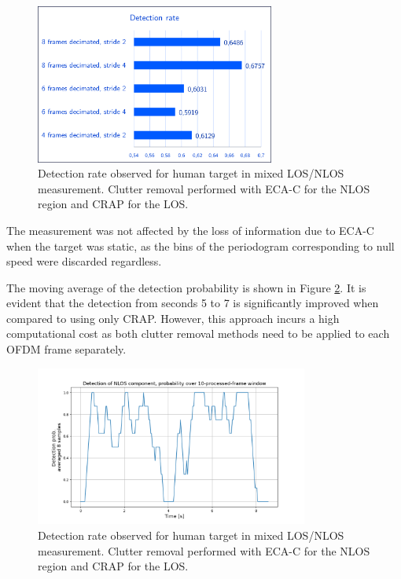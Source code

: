 \begin{figure}[H]
	\centering
	\includegraphics[width=0.7\textwidth]{Images/Test1/detect_hist/detect_hist_human_ECAC_LMsans.png}
	\caption{\small Detection rate observed for human target in mixed LOS/NLOS measurement. Clutter removal performed with ECA-C for the NLOS region and CRAP for the LOS.}
	\label{fig:Test1_detect_hist_crap-ecac}
\end{figure}


The measurement was not affected by the loss of information due to ECA-C when the target was static, as the bins of the periodogram corresponding to null speed were discarded regardless.

The moving average of the detection probability is shown in Figure \ref{fig:Test1_mov_avg_crap_ecac}.
It is evident that the detection from seconds 5 to 7 is significantly improved when compared to using only CRAP.
However, this approach incurs a high computational cost as both clutter removal methods need to be applied to each OFDM frame separately.

\begin{figure}[H]
	\centering
	\includegraphics[width=0.8\textwidth]{Images/Test1/ECAC_CRAP_mixed/movavg_6frames_mixedecac-crap_stride4_exp_thresh.png}
	\caption{\small Detection rate observed for human target in mixed LOS/NLOS measurement. Clutter removal performed with ECA-C for the NLOS region and CRAP for the LOS.}
	\label{fig:Test1_mov_avg_crap_ecac}
\end{figure}
